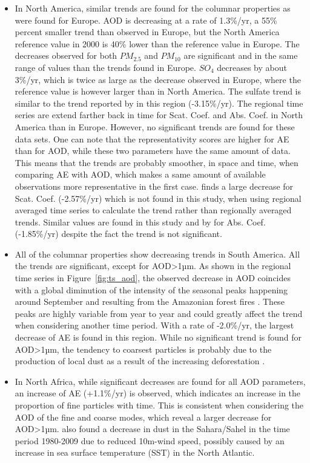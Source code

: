 \documentclass[journal abbreviation, manuscript]{copernicus}
\begin{document}
\begin{itemize}
 \item In North America, similar trends are found for the columnar properties as were found for Europe. AOD is decreasing at a rate of 1.3\%/yr, a 55\% percent smaller trend than observed in Europe, but the North America reference value in 2000 is 40\% lower than the reference value in Europe. The decreases observed for both $PM_{2.5}$ and $PM_{10}$ are significant and in the same range of values than the trends found in Europe. $SO_{4}$ decreases by about 3\%/yr, which is twice as large as the decrease observed in Europe, where the reference value is however larger than in North America. The sulfate trend is similar to the trend reported by \cite{aas2019global} in this region (-3.15\%/yr). The regional time series are extend farther back in time for Scat. Coef. and Abs. Coef. in North America than in Europe. However, no significant trends are found for these data sets. One can note that the representativity scores are higher for AE than for AOD, while these two parameters have the same amount of data. This means that the trends are probably smoother, in space and time, when comparing AE with AOD, which makes a same amount of available observations more representative in the first case. \cite{collaudcoenprep} finds a large decrease for Scat. Coef. (-2.57\%/yr) which is not found in this study, when using regional averaged time series to calculate the trend rather than regionally averaged trends. Similar values are found in this study and by \cite{collaudcoenprep} for Abs. Coef. (-1.85\%/yr) despite the fact the trend is not significant.
 \item All of the columnar properties show decreasing trends in South America. All the trends are significant, except for AOD>1µm. As shown in the regional time series in Figure~\ref{fig:ts_aod}, the observed decrease in AOD coincides with a global diminution of the intensity of the seasonal peaks happening around September and resulting from the Amazonian forest fires \citep{aragao201821st}. These peaks are highly variable from year to year and could greatly affect the trend when considering another time period. With a rate of -2.0\%/yr, the largest decrease of AE is found in this region. While no significant trend is found for AOD>1µm, the tendency to coarsest particles is probably due to the production of local dust as a result of the increasing deforestation \citep{werth2002local,betts2008effects}.
 \item In North Africa, while significant decreases are found for all AOD parameters, an increase of AE (+1.1\%/yr) is observed, which indicates an increase in the proportion of fine particles with time. This is consistent when considering the AOD of the fine and coarse modes, which reveal a larger decrease for AOD>1µm. \cite{chin2014multi} also found a decrease in dust in the Sahara/Sahel in the time period 1980-2009 due to reduced 10m-wind speed, possibly caused by an increase in sea surface temperature (SST) in the North Atlantic.

\end{itemize}
\end{document}
